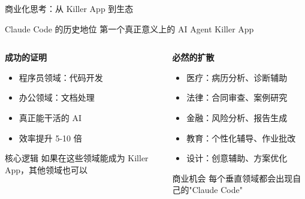 \documentclass[aspectratio=169,xcolor=dvipsnames]{beamer}
\begin{document}
\begin{frame}{商业化思考：从 Killer App 到生态}
  \begin{block}{Claude Code 的历史地位}
    第一个真正意义上的 AI Agent Killer App
  \end{block}

  \vspace{0.3cm}

  \begin{columns}
    \begin{column}{0.48\textwidth}
      \textbf{成功的证明}
      \begin{itemize}
        \item 程序员领域：代码开发
        \item 办公领域：文档处理
        \item 真正能干活的 AI
        \item 效率提升 5-10 倍
      \end{itemize}

      \vspace{0.3cm}

      \begin{exampleblock}{核心逻辑}
        如果在这些领域能成为 Killer App，其他领域也可以
      \end{exampleblock}
    \end{column}
    \begin{column}{0.48\textwidth}
      \textbf{必然的扩散}
      \begin{itemize}
        \item 医疗：病历分析、诊断辅助
        \item 法律：合同审查、案例研究
        \item 金融：风险分析、报告生成
        \item 教育：个性化辅导、作业批改
        \item 设计：创意辅助、方案优化
      \end{itemize}

      \vspace{0.3cm}

      \begin{alertblock}{商业机会}
        每个垂直领域都会出现自己的"Claude Code"
      \end{alertblock}
    \end{column}
  \end{columns}
\end{frame}
\end{document}
